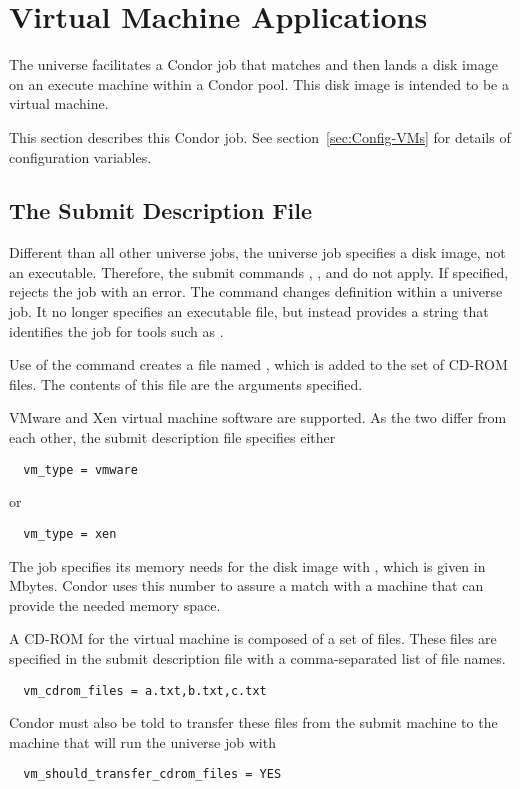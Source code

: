 \section{\label{sec:vmuniverse}Virtual Machine Applications}

The  universe facilitates a Condor job
that matches and then lands a disk image on an execute machine
within a Condor pool.
This disk image is intended to be a virtual machine.

This section describes this Condor job.
See section~\ref{sec:Config-VMs}
for details of configuration variables.

\subsection{\label{sec:vm-submitfile}The Submit Description File}

Different than all other universe jobs,
the  universe job specifies a disk image,
not an executable.
Therefore, the submit commands , ,
and  do not apply.
If specified,  rejects the job with an error.
The  command changes definition within a
 universe job.
It no longer specifies an executable file, but instead
provides a string that identifies the job for tools such
as .

Use of the  command creates a file named ,
which is added to the set of CD-ROM files.
The contents of this file are the arguments specified.

VMware and Xen virtual machine software are supported.
As the two differ from each other, the submit description file
specifies either
\begin{verbatim}
  vm_type = vmware
\end{verbatim}
or
\begin{verbatim}
  vm_type = xen
\end{verbatim}

The job specifies its memory needs 
for the disk image with ,
which is given in Mbytes.
Condor uses this number to assure a match with a machine
that can provide the needed memory space.

A CD-ROM for the virtual machine is composed of a set of files.
These files are specified in the submit description file
with a comma-separated list of file names.
\begin{verbatim}
  vm_cdrom_files = a.txt,b.txt,c.txt
\end{verbatim}
Condor must also be told to transfer these files from
the submit machine to the machine that will run the
 universe job with 
\begin{verbatim}
  vm_should_transfer_cdrom_files = YES
\end{verbatim}

